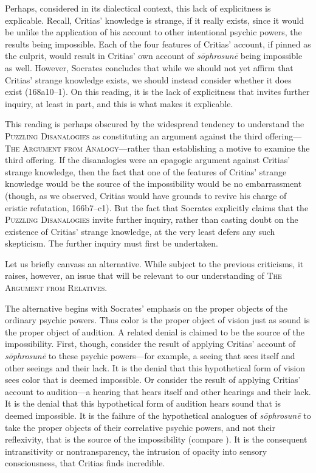 Perhaps, considered in its dialectical context, this lack of explicitness is explicable. Recall, Critias' knowledge is strange, if it really exists, since it would be unlike the application of his account to other intentional psychic powers, the results being impossible. Each of the four features of Critias' account, if pinned as the culprit, would result in Critias' own account of \emph{sōphrosunē} being impossible as well. However, Socrates concludes that while we should not yet affirm that Critias' strange knowledge exists, we should instead consider whether it does exist (168a10–1). On this reading, it is the lack of explicitness that invites further inquiry, at least in part, and this is what makes it explicable.

This reading is perhaps obscured by the widespread tendency to understand the \textsc{Puzzling Disanalogies} as constituting an argument against the third offering—\textsc{The Argument from Analogy}—rather than establishing a motive to examine the third offering. If the disanalogies were an epagogic argument against Critias' strange knowledge, then the fact that one of the features of Critias' strange knowledge would be the source of the impossibility would be no embarrassment (though, as we observed, Critias would have grounds to revive his charge of eristic refutation, 166b7–c1). But the fact that Socrates explicitly claims that the \textsc{Puzzling Disanalogies} invite further inquiry, rather than casting doubt on the existence of Critias' strange knowledge, at the very least defers any such skepticism. The further inquiry must first be undertaken.

Let us briefly canvass an alternative. While subject to the  previous criticisms, it raises, however, an issue that will be relevant to our understanding of \textsc{The Argument from Relatives}.

The alternative begins with Socrates' emphasis on the proper objects of the ordinary psychic powers. Thus color is the proper object of vision just as sound is the proper object of audition. A related denial is claimed to be the source of the impossibility. First, though, consider the result of applying Critias' account of \emph{sōphrosunē} to these psychic powers—for example, a seeing that sees itself and other seeings and their lack. It is the denial that this hypothetical form of vision sees color that is deemed impossible. Or consider the result of applying Critias' account to audition—a hearing that hears itself and other hearings and their lack. It is the denial that this hypothetical form of audition hears sound that is deemed impossible. It is the failure of the hypothetical analogues of \emph{sōphrosunē} to take the proper objects of their correlative psychic powers, and not their reflexivity, that is the source of the impossibility (compare \citealt[212–4]{Tuozzo:2011aa}). It is the consequent intransitivity or nontransparency, the intrusion of opacity into sensory consciousness, that Critias finds incredible.

